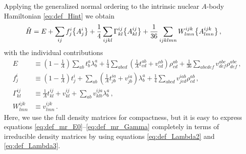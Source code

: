 Applying the generalized normal ordering to the intrinsic nuclear $A$-body 
Hamiltonian \eqref{eq:def_Hint} we obtain
\begin{align}\label{eq:Hno}
  \HO &= E 
        + \sum_{ij}f^{i}_{j}\nord{A^{i}_{j}} 
        + \frac{1}{4}\sum_{ijkl}\Gamma^{ij}_{kl}\nord{A^{ij}_{kl}}
        + \frac{1}{36}\sum_{ijklmn}W^{ijk}_{lmn}\nord{A^{ijk}_{lmn}}\,,
\end{align}
with the individual contributions 
\begin{align}
  E &\equiv \left(1-\frac{1}{A}\right)\sum_{ab}t^{a}_{b}\lambda^{a}_{b}
        + \frac{1}{4}\sum_{abcd}\left(\frac{1}{A}t^{ab}_{cd} + v^{ab}_{cd}\right)\rho^{ab}_{cd}
      + \frac{1}{36}\sum_{abcdef}v^{abc}_{def} \rho^{abc}_{def}\,,
      \label{eq:def_mr_E0}\\
%
  f^{i}_{j} &\equiv \left(1-\frac{1}{A}\right)t^{i}_{j} + \sum_{ab}\left(\frac{1}{A}t^{ia}_{jb} + v^{ia}_{jb}\right)\lambda^{a}_{b}
  + \frac{1}{4}\sum_{abcd}v^{iab}_{jcd}\rho^{ab}_{cd}\,,\label{eq:def_mr_f}   \\
% 
  \Gamma^{ij}_{kl} &\equiv \frac{1}{A}t^{ij}_{kl} + v^{ij}_{kl} + \sum_{ab}v^{ija}_{klb}\lambda^{a}_{b}\,,\label{eq:def_mr_Gamma}\\
  W^{ijk}_{lmn}&\equiv v^{ijk}_{lmn}\,.
\end{align}
Here, we use the full density matrices for compactness, but it is easy to express
equations \eqref{eq:def_mr_E0}--\eqref{eq:def_mr_Gamma} completely in terms of irreducible density
matrices by using equations \eqref{eq:def_Lambda2} and \eqref{eq:def_Lambda3}. 

%
%
